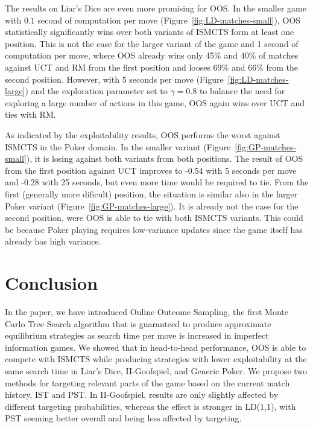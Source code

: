 \documentclass{aamas2015}
\newcounter{mlNoteCounter}
\newcommand{\mlnote}[1]{{\scriptsize \color{darkgreen} $\blacksquare$ \refstepcounter{mlNoteCounter}\textsf{[ML]$_{\arabic{mlNoteCounter}}$:{#1}}}}
\renewcommand{\mlnote}[1]{}
\begin{document}
The results on Liar's Dice are even more promising for OOS. In the smaller game with $0.1$ second of computation per move (Figure~\ref{fig:LD-matches-small}), OOS statistically significantly wins over both variants of ISMCTS form at least one position. This is not the case for the larger variant of the game and 1 second of computation per move, where OOS already wins only 45\% and 40\% of matches against UCT and RM from the first position and looses 69\% and 66\% from the second position. 
However, with 5 seconds per move (Figure~\ref{fig:LD-matches-large}) and the exploration parameter set to $\gamma=0.8$ to balance the need for exploring a large number of actions in this game, OOS again wins over UCT and ties with RM.

As indicated by the exploitability results, OOS performs the worst against ISMCTS in the Poker domain. In the smaller variant (Figure~\ref{fig:GP-matches-small}), it is losing against both variants from both positions. The result of OOS from the first position against UCT improves to -0.54 with 5 seconds per move and -0.28 with 25 seconds, but even more time would be required to tie. From the first (generally more dificult) position, the situation is similar also in the larger Poker variant (Figure~\ref{fig:GP-matches-large}). It is already not the case for the second position, were OOS is able to tie with both ISMCTS variants. 
This could be because Poker playing requires low-variance updates since the game itself has already has high variance. 



\section{Conclusion}

\mlnote{Still needs expanding.}
In the paper, we have introduced Online Outcome Sampling, the first Monte Carlo 
Tree Search algorithm that is guaranteed to produce  
approximate equilibrium strategies as search time per move is increased in imperfect information games.
We showed that in head-to-head performance, OOS is able to compete with 
ISMCTS while producing strategies with lower exploitability
at the same search time in Liar's Dice, II-Goofspiel, and Generic Poker.
We propose two methods for targeting relevant parts of the game based on the current match history, 
IST and PST.
In II-Goofspiel, results are only slightly affected by different targeting probabilities, whereas the
effect is stronger in LD(1,1), with PST seeming better overall and being less affected by targeting. 
\end{document}
